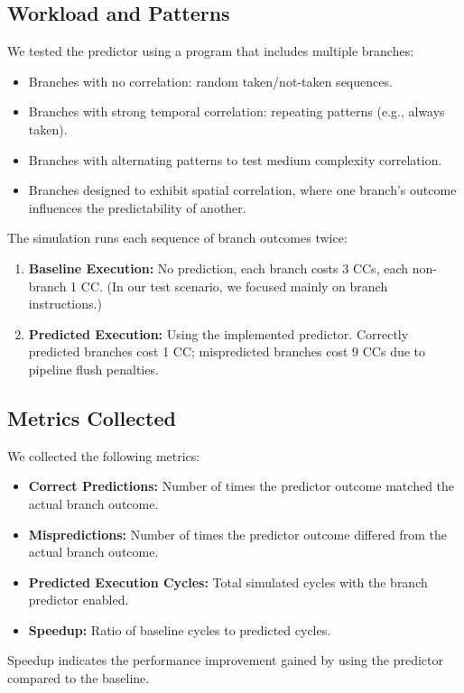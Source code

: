 \documentclass[12pt,letterpaper]{article}
\begin{document}
	\subsection{Workload and Patterns}
	We tested the predictor using a program that includes multiple branches:
	\begin{itemize}
		\item Branches with no correlation: random taken/not-taken sequences.
		\item Branches with strong temporal correlation: repeating patterns (e.g., always taken).
		\item Branches with alternating patterns to test medium complexity correlation.
		\item Branches designed to exhibit spatial correlation, where one branch's outcome influences the predictability of another.
	\end{itemize}
	
	The simulation runs each sequence of branch outcomes twice:
	\begin{enumerate}
		\item \textbf{Baseline Execution:} No prediction, each branch costs 3 CCs, each non-branch 1 CC. (In our test scenario, we focused mainly on branch instructions.)
		\item \textbf{Predicted Execution:} Using the implemented predictor. Correctly predicted branches cost 1 CC; mispredicted branches cost 9 CCs due to pipeline flush penalties.
	\end{enumerate}
	
	\subsection{Metrics Collected}
	We collected the following metrics:
	\begin{itemize}
		\item \textbf{Correct Predictions:} Number of times the predictor outcome matched the actual branch outcome.
		\item \textbf{Mispredictions:} Number of times the predictor outcome differed from the actual branch outcome.
		\item \textbf{Predicted Execution Cycles:} Total simulated cycles with the branch predictor enabled.
		\item \textbf{Speedup:} Ratio of baseline cycles to predicted cycles.
	\end{itemize}
	
	Speedup indicates the performance improvement gained by using the predictor compared to the baseline.
	
\end{document}

